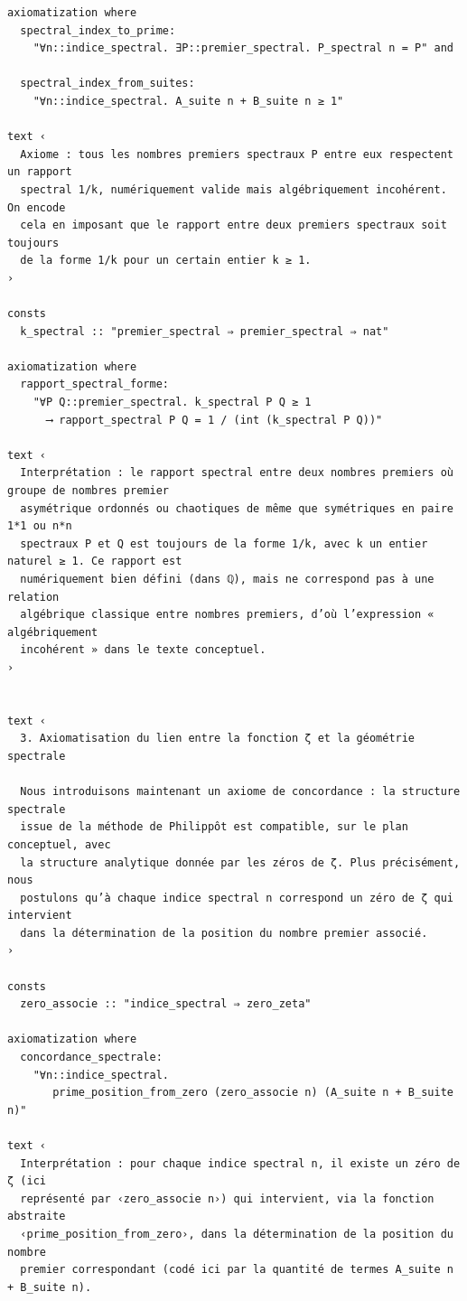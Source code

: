 \documentclass[a4paper,11pt]{article}
\begin{document}
\begin{holcode}[title={\textcolor{white}{File: methode\_spectral.thy -- Part 1/4}}]
\begin{lstlisting}
axiomatization where
  spectral_index_to_prime:
    "∀n::indice_spectral. ∃P::premier_spectral. P_spectral n = P" and

  spectral_index_from_suites:
    "∀n::indice_spectral. A_suite n + B_suite n ≥ 1"

text ‹
  Axiome : tous les nombres premiers spectraux P entre eux respectent un rapport
  spectral 1/k, numériquement valide mais algébriquement incohérent. On encode
  cela en imposant que le rapport entre deux premiers spectraux soit toujours
  de la forme 1/k pour un certain entier k ≥ 1.
›

consts
  k_spectral :: "premier_spectral ⇒ premier_spectral ⇒ nat"

axiomatization where
  rapport_spectral_forme:
    "∀P Q::premier_spectral. k_spectral P Q ≥ 1
      ⟶ rapport_spectral P Q = 1 / (int (k_spectral P Q))"

text ‹
  Interprétation : le rapport spectral entre deux nombres premiers où groupe de nombres premier   
  asymétrique ordonnés ou chaotiques de même que symétriques en paire 1*1 ou n*n
  spectraux P et Q est toujours de la forme 1/k, avec k un entier naturel ≥ 1. Ce rapport est
  numériquement bien défini (dans ℚ), mais ne correspond pas à une relation
  algébrique classique entre nombres premiers, d’où l’expression « algébriquement
  incohérent » dans le texte conceptuel.
›


text ‹
  3. Axiomatisation du lien entre la fonction ζ et la géométrie spectrale

  Nous introduisons maintenant un axiome de concordance : la structure spectrale
  issue de la méthode de Philippôt est compatible, sur le plan conceptuel, avec
  la structure analytique donnée par les zéros de ζ. Plus précisément, nous
  postulons qu’à chaque indice spectral n correspond un zéro de ζ qui intervient
  dans la détermination de la position du nombre premier associé.
›

consts
  zero_associe :: "indice_spectral ⇒ zero_zeta"

axiomatization where
  concordance_spectrale:
    "∀n::indice_spectral.
       prime_position_from_zero (zero_associe n) (A_suite n + B_suite n)"

text ‹
  Interprétation : pour chaque indice spectral n, il existe un zéro de ζ (ici
  représenté par ‹zero_associe n›) qui intervient, via la fonction abstraite
  ‹prime_position_from_zero›, dans la détermination de la position du nombre
  premier correspondant (codé ici par la quantité de termes A_suite n + B_suite n).


\end{lstlisting}
\end{holcode}
\end{document}
